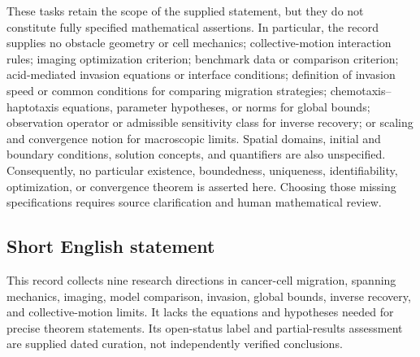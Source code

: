 \documentclass[11pt]{article}
\begin{document}
These tasks retain the scope of the supplied statement, but they do not constitute fully specified mathematical assertions. In particular, the record supplies no obstacle geometry or cell mechanics; collective-motion interaction rules; imaging optimization criterion; benchmark data or comparison criterion; acid-mediated invasion equations or interface conditions; definition of invasion speed or common conditions for comparing migration strategies; chemotaxis--haptotaxis equations, parameter hypotheses, or norms for global bounds; observation operator or admissible sensitivity class for inverse recovery; or scaling and convergence notion for macroscopic limits. Spatial domains, initial and boundary conditions, solution concepts, and quantifiers are also unspecified. Consequently, no particular existence, boundedness, uniqueness, identifiability, optimization, or convergence theorem is asserted here. Choosing those missing specifications requires source clarification and human mathematical review.
\subsection{Short English statement}
This record collects nine research directions in cancer-cell migration, spanning mechanics, imaging, model comparison, invasion, global bounds, inverse recovery, and collective-motion limits. It lacks the equations and hypotheses needed for precise theorem statements. Its open-status label and partial-results assessment are supplied dated curation, not independently verified conclusions.
\end{document}

